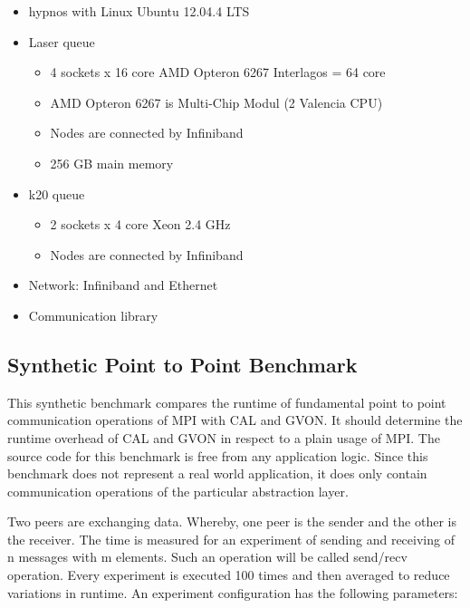 \begin{itemize}
  \begin{itemize}
  \item hypnos with Linux Ubuntu 12.04.4 LTS
  \item Laser queue
    \begin{itemize}
    \item 4 sockets x 16 core AMD Opteron 6267 Interlagos = 64 core 
    \item AMD Opteron 6267 is Multi-Chip Modul (2 Valencia CPU)
    \item Nodes are connected by Infiniband
    \item 256 GB main memory
    \end{itemize}
  \item k20 queue
    \begin{itemize}
    \item 2 sockets x 4 core Xeon 2.4 GHz
    \item Nodes are connected by Infiniband
    \end{itemize}
  \item Network: Infiniband and Ethernet
  \item Communication library
  \end{itemize}
\end{itemize}

\subsection{Synthetic Point to Point Benchmark}

This synthetic benchmark compares the runtime of fundamental point to
point communication operations of MPI with CAL and GVON. It should
determine the runtime overhead of CAL and GVON in respect to a plain
usage of MPI. The source code for this benchmark is free from any
application logic. Since this benchmark does not represent a real
world application, it does only contain communication operations of
the particular abstraction layer.

Two peers are exchanging data. Whereby, one peer is the sender and the
other is the receiver. The time is measured for an experiment of
sending and receiving of n messages with m elements. Such an operation
will be called send/recv operation. Every experiment is executed 100
times and then averaged to reduce variations in runtime. An experiment
configuration has the following parameters:

